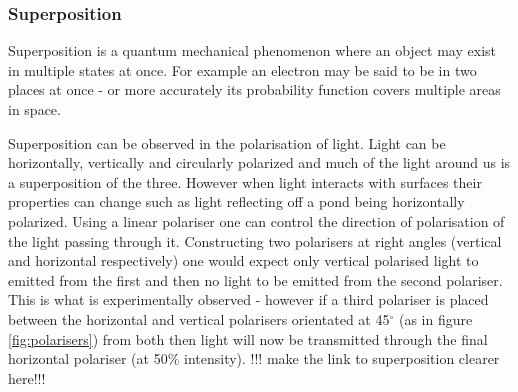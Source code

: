 \subsubsection{Superposition}
Superposition is a quantum mechanical phenomenon where an object may exist in multiple states at once. 
For example an electron may be said to be in two places at once - or more accurately its probability function covers multiple areas in space. \cite{noauthor_whatCal_nodate}

Superposition can be observed in the polarisation of light. 
Light can be horizontally, vertically and circularly polarized and much of the light around us is a superposition of the three.
However when light interacts with surfaces their properties can change such as light reflecting off a pond being horizontally polarized. 
Using a linear polariser one can control the direction of polarisation of the light passing through it.
Constructing two polarisers at right angles (vertical and horizontal respectively) one would expect only vertical polarised light to emitted from the first and then no light to be emitted from the second polariser. 
This is what is experimentally observed - however if a third polariser is placed between the horizontal and vertical polarisers orientated at 45$^\circ$ (as in figure \ref{fig:polarisers}) from both then light will now be transmitted through the final horizontal polariser (at 50$\%$ intensity). \cite{noauthor_whatCal_nodate}
!!! make the link to superposition clearer here!!!

